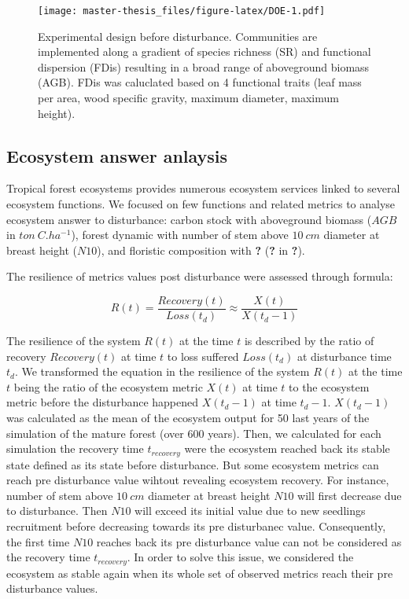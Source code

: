 \documentclass[12pt,]{article}
\theoremstyle{definition}
\theoremstyle{definition}
\theoremstyle{remark}
\begin{document}
\begin{figure}[htbp]
\centering
\texttt{[image: master-thesis\_files/figure-latex/DOE-1.pdf]}
\caption{\label{fig:DOE}Experimental design before disturbance. Communities
are implemented along a gradient of species richness (SR) and functional
dispersion (FDis) resulting in a broad range of aboveground biomass
(AGB). FDis was caluclated based on 4 functional traits (leaf mass per
area, wood specific gravity, maximum diameter, maximum height).}
\end{figure}

\subsection{Ecosystem answer anlaysis}\label{ecosystem-answer-anlaysis}

Tropical forest ecosystems provides numerous ecosystem services linked
to several ecosystem functions. We focused on few functions and related
metrics to analyse ecosystem answer to disturbance: carbon stock with
aboveground biomass (\(AGB\) in \(ton~C.ha^{-1}\)), forest dynamic with
number of stem above \(10~cm\) diameter at breast height (\(N10\)), and
floristic composition with \textbf{?} (\textbf{?} in \textbf{?}).

The resilience of metrics values post disturbance were assessed through
\citet{Henry2012} formula:

\begin{equation}
  R\left(t\right)=\frac{Recovery\left(t\right)}{Loss\left(t_d\right)} \approx \frac{X(t)}{X(t_d-1)}
  \label{eq:Resilience}
\end{equation}

The resilience of the system \(R(t)\) at the time \(t\) is described by
the ratio of recovery \(Recovery(t)\) at time \(t\) to loss suffered
\(Loss(t_d)\) at disturbance time \(t_d\). We transformed the equation
in the resilience of the system \(R(t)\) at the time \(t\) being the
ratio of the ecosystem metric \(X(t)\) at time \(t\) to the ecosystem
metric before the disturbance happened \(X(t_d-1)\) at time \(t_d-1\).
\(X(t_d-1)\) was calculated as the mean of the ecosystem output for 50
last years of the simulation of the mature forest (over 600 years).
Then, we calculated for each simulation the recovery time
\(t_{recovery}\) were the ecosystem reached back its stable state
defined as its state before disturbance. But some ecosystem metrics can
reach pre disturbance value wihtout revealing ecosystem recovery. For
instance, number of stem above \(10~cm\) diameter at breast height
\(N10\) will first decrease due to disturbance. Then \(N10\) will exceed
its initial value due to new seedlings recruitment before decreasing
towards its pre disturbanec value. Consequently, the first time \(N10\)
reaches back its pre disturbance value can not be considered as the
recovery time \(t_{recovery}\). In order to solve this issue, we
considered the ecosystem as stable again when its whole set of observed
metrics reach their pre disturbance values.
\end{document}

